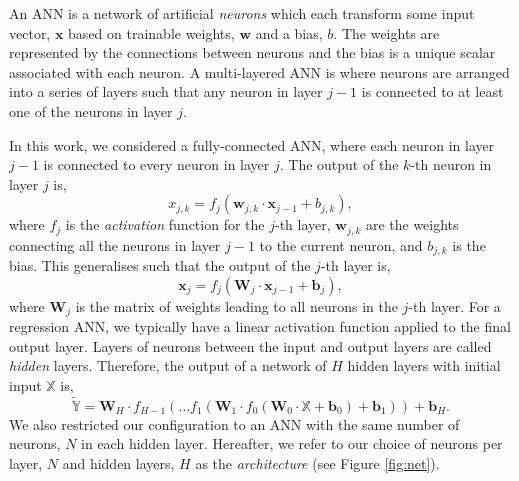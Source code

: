 \documentclass[fleqn,usenatbib]{mnras}
\begin{document}
An ANN is a network of artificial \emph{neurons} which each transform some input vector, $\boldsymbol{x}$ based on trainable weights, $\boldsymbol{w}$ and a bias, $b$. The weights are represented by the connections between neurons and the bias is a unique scalar associated with each neuron. A multi-layered ANN is where neurons are arranged into a series of layers such that any neuron in layer $j-1$ is connected to at least one of the neurons in layer $j$. 

In this work, we considered a fully-connected ANN, where each neuron in layer $j-1$ is connected to every neuron in layer $j$. The output of the $k$-th neuron in layer $j$ is, 
%
\begin{equation}
    x_{j, k}=f_j(\boldsymbol{w}_{j, k} \cdot \boldsymbol{x}_{j-1} + b_{j, k}),
\end{equation}
%
where $f_j$ is the \emph{activation} function for the $j$-th layer, $\boldsymbol{w}_{j, k}$ are the weights connecting all the neurons in layer $j-1$ to the current neuron, and $b_{j, k}$ is the bias. This generalises such that the output of the $j$-th layer is,
%
\begin{equation}
    \boldsymbol{x}_{j}=f_j(\boldsymbol{W}_{j} \cdot \boldsymbol{x}_{j-1} + \boldsymbol{b}_{j}),
\end{equation}
%
where $\boldsymbol{W}_j$ is the matrix of weights leading to all neurons in the $j$-th layer. For a regression ANN, we typically have a linear activation function applied to the final output layer. Layers of neurons between the input and output layers are called \emph{hidden} layers. Therefore, the output of a network of $H$ hidden layers with initial input $\boldsymbol{\mathbb{X}}$ is,
%
\begin{equation}
    \widetilde{\boldsymbol{\mathbb{Y}}} = \boldsymbol{W}_{H} \cdot f_{H-1}(\dots f_1(\boldsymbol{W}_1 \cdot f_0(\boldsymbol{W}_{0} \cdot \boldsymbol{\mathbb{X}} + \boldsymbol{b}_{0}) + \boldsymbol{b}_1) ) + \boldsymbol{b}_{H}.
\end{equation}
%
We also restricted our configuration to an ANN with the same number of neurons, $N$ in each hidden layer. Hereafter, we refer to our choice of neurons per layer, $N$ and hidden layers, $H$ as the \emph{architecture} (see Figure \ref{fig:net}).
\end{document}
